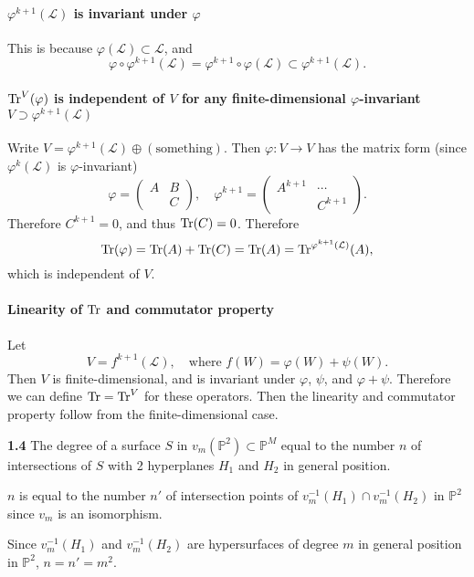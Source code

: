 \documentclass{article}
\makeatletter
\newcommand*{\shifttext}[1]{%
  \settowidth{\@tempdima}{#1}%
  \hspace{-\@tempdima}#1%
}
\newcommand{\plabel}[1]{%
\shifttext{\textbf{#1}\quad}%
}
\newcommand{\prule}{%
\begin{center}%
\hdashrule[0.5ex]{.99\linewidth}{1pt}{1pt 2.5pt}%
\end{center}%
}
\makeatother
\begin{document}
\paragraph*{$\varphi^{k+1}(\mathcal{L})$ is invariant under $\varphi$}
This is because $\varphi(\mathcal{L})\subset \mathcal{L}$, and
\[ \varphi \circ \varphi^{k+1}(\mathcal{L}) = \varphi^{k+1}\circ \varphi(\mathcal{L}) \subset \varphi^{k+1}(\mathcal{L}). \]

\paragraph*{$\Tr^V(\varphi)$ is independent of $V$ for any finite-dimensional $\varphi$-invariant $V\supset \varphi^{k+1}(\mathcal{L})$}
Write $V = \varphi^{k+1}(\mathcal{L}) \oplus (\text{something})$.
Then $\varphi\colon V\to V$ has the matrix form (since $\varphi^k(\mathcal{L})$ is $\varphi$-invariant)
\[ \varphi = \begin{pmatrix}
    A & B \\ & C
\end{pmatrix},\quad \varphi^{k+1} = \begin{pmatrix}
    A^{k+1} & \cdots \\ & C^{k+1}
\end{pmatrix}. \]
Therefore $C^{k+1} = 0$, and thus $\Tr(C) = 0$.
Therefore
\[ \Tr(\varphi) = \Tr(A) + \Tr(C) = \Tr(A) = \Tr^{\varphi^{k+1}(\mathcal{L})}(A), \]
which is independent of $V$.

\paragraph*{Linearity of $\Tr$ and commutator property}
Let
\[ V = f^{k+1}(\mathcal{L}),\quad \text{where } f(W) = \varphi(W) + \psi(W). \]
Then $V$ is finite-dimensional, and is invariant under $\varphi$, $\psi$, and $\varphi + \psi$.
Therefore we can define $\Tr = \Tr^V$ for these operators.
Then the linearity and commutator property follow from the finite-dimensional case.

\prule

\plabel{1.4}%
The degree of a surface $S$ in $v_m(\mathbb{P}^2)\subset \mathbb{P}^M$ equal to the number $n$ of intersections of $S$ with 2 hyperplanes $H_1$ and $H_2$ in general position.
\par
$n$ is equal to the number $n'$ of intersection points of $v_m^{-1}(H_1) \cap v_m^{-1}(H_2)$ in $\mathbb{P}^2$ since $v_m$ is an isomorphism.
\par
Since $v_m^{-1}(H_1)$ and $v_m^{-1}(H_2)$ are hypersurfaces of degree $m$ in general position in $\mathbb{P}^2$, $n = n' = m^2$.
\end{document}
